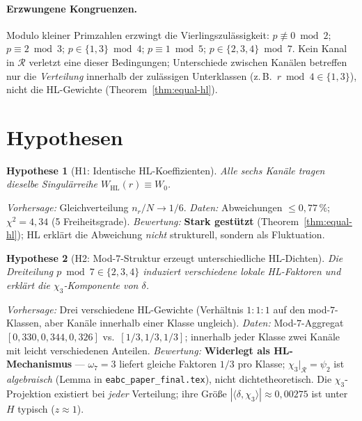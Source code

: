 \documentclass[11pt,a4paper]{article}
\newtheorem{hypothesis}{Hypothese}
\newcommand{\R}{\mathcal{R}}
\newcommand{\HL}{\mathrm{HL}}
\begin{document}
\paragraph{Erzwungene Kongruenzen.}
Modulo kleiner Primzahlen erzwingt die Vierlingszulässigkeit:
$p\not\equiv 0\bmod 2$;
$p\equiv 2\bmod 3$;
$p\in\{1,3\}\bmod 4$;
$p\equiv 1\bmod 5$;
$p\in\{2,3,4\}\bmod 7$.
Kein Kanal in $\R$ verletzt eine dieser Bedingungen; Unterschiede zwischen
Kanälen betreffen nur die \emph{Verteilung} innerhalb der zulässigen
Unterklassen (z.\,B.\ $r\bmod 4\in\{1,3\}$), nicht die HL-Gewichte
(Theorem~\ref{thm:equal-hl}).

\section{Hypothesen}

\begin{hypothesis}[H1: Identische HL-Koeffizienten]
\label{hyp:H1}
Alle sechs Kanäle tragen dieselbe Singulärreihe $W_{\HL}(r)\equiv W_0$.
\end{hypothesis}

\emph{Vorhersage:} Gleichverteilung $n_r/N\to 1/6$.
\emph{Daten:} Abweichungen $\le 0{,}77\,\%$; $\chi^2=4{,}34$ (5 Freiheitsgrade).
\emph{Bewertung:} \textbf{Stark gestützt} (Theorem~\ref{thm:equal-hl});
HL erklärt die Abweichung \emph{nicht} strukturell, sondern als Fluktuation.

\begin{hypothesis}[H2: Mod-$7$-Struktur erzeugt unterschiedliche HL-Dichten]
\label{hyp:H2}
Die Dreiteilung $p\bmod 7\in\{2,3,4\}$ induziert verschiedene lokale
HL-Faktoren und erklärt die $\chi_3$-Komponente von $\delta$.
\end{hypothesis}

\emph{Vorhersage:} Drei verschiedene HL-Gewichte
(Verhältnis $1:1:1$ auf den mod-$7$-Klassen, aber Kanäle innerhalb
einer Klasse ungleich).
\emph{Daten:} Mod-$7$-Aggregat $[0{,}330,0{,}344,0{,}326]$ vs.\ $[1/3,1/3,1/3]$;
innerhalb jeder Klasse zwei Kanäle mit leicht verschiedenen Anteilen.
\emph{Bewertung:} \textbf{Widerlegt als HL-Mechanismus} --- $\omega_7=3$
liefert gleiche Faktoren $1/3$ pro Klasse; $\chi_3|_{\R}=\psi_2$ ist
\emph{algebraisch} (Lemma in \texttt{eabc\_paper\_final.tex}), nicht
dichtetheoretisch. Die $\chi_3$-Projektion existiert bei \emph{jeder}
Verteilung; ihre Größe $|\langle\delta,\chi_3\rangle|\approx 0{,}00275$
ist unter $H$ typisch ($z\approx 1$).
\end{document}

